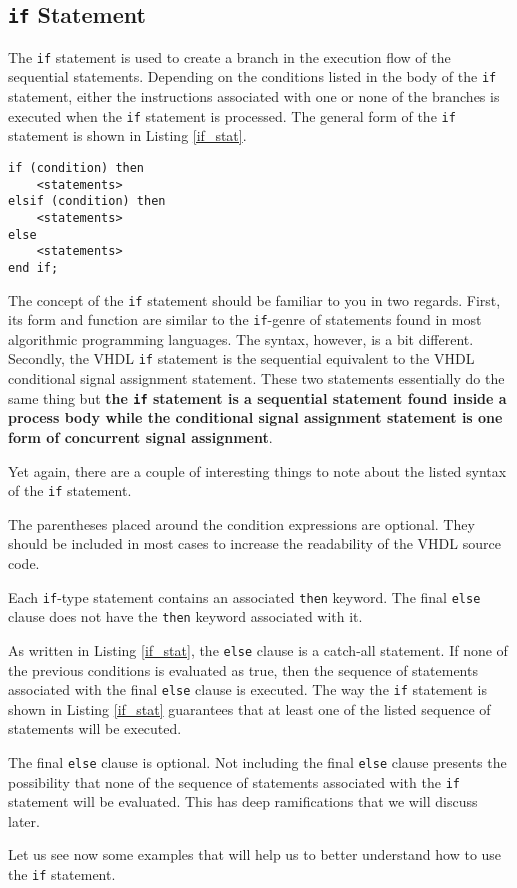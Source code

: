 \subsection{\texttt{if} Statement}
The \texttt{if} statement is used to create a branch in the execution flow of the sequential statements. Depending on the conditions listed in the body of the \texttt{if} statement, either the instructions associated with one or none of the branches is executed when the \texttt{if} statement is processed. The general form of the \texttt{if} statement is shown in Listing \ref{if_stat}.
\begin{lstlisting}[label=if_stat, caption=Syntax of the \texttt{if} statement.]
if (condition) then
	<statements>
elsif (condition) then
	<statements>
else
	<statements>
end if;
\end{lstlisting}
The concept of the \texttt{if} statement should be familiar to you in two regards. First, its form and function are similar to the \texttt{if}-genre of statements found in most algorithmic programming languages. The syntax, however, is a bit different. Secondly, the VHDL \texttt{if} statement is the sequential equivalent to the VHDL conditional signal assignment statement. These two statements essentially do the same thing but \textbf{the \texttt{if} statement is a sequential statement found inside a process body while the conditional signal assignment statement is one form of concurrent signal assignment}.

Yet again, there are a couple of interesting things to note about the listed syntax of the \texttt{if} statement.
\begin{my_list}
\item The parentheses placed around the condition expressions are optional. They should be included in most cases to increase the readability of the VHDL source code.
\item Each \texttt{if}-type statement contains an associated \texttt{then} keyword. The final \texttt{else} clause does not have the \texttt{then} keyword associated with it.
\item As written in Listing \ref{if_stat}, the \texttt{else} clause is a catch-all statement. If none of the previous conditions is evaluated as true, then the sequence of statements associated with the final \texttt{else} clause is executed. The way the \texttt{if} statement is shown in Listing \ref{if_stat} guarantees that at least one of the listed sequence of statements will be executed.
\item The final \texttt{else} clause is optional. Not including the final \texttt{else} clause presents the possibility that none of the sequence of statements associated with the \texttt{if} statement will be evaluated. This has deep ramifications that we will discuss later.
\end{my_list}
Let us see now some examples that will help us to better understand how to use the \texttt{if} statement.

